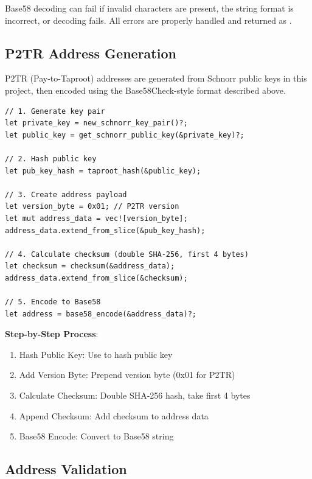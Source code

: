 Base58 decoding can fail if invalid characters are present, the string format is incorrect, or decoding fails. All errors are properly handled and returned as .

\subsection{P2TR Address Generation}
\label{sec:ch08-p2tr-address}

P2TR (Pay-to-Taproot) addresses are generated from Schnorr public keys in this project, then encoded using the Base58Check-style format described above.

\begin{listing}[htbp]
\caption{P2TR address generation flow}
\label{lst:ch08-p2tr-gen}
\begin{verbatim}
// 1. Generate key pair
let private_key = new_schnorr_key_pair()?;
let public_key = get_schnorr_public_key(&private_key)?;

// 2. Hash public key
let pub_key_hash = taproot_hash(&public_key);

// 3. Create address payload
let version_byte = 0x01; // P2TR version
let mut address_data = vec![version_byte];
address_data.extend_from_slice(&pub_key_hash);

// 4. Calculate checksum (double SHA-256, first 4 bytes)
let checksum = checksum(&address_data);
address_data.extend_from_slice(&checksum);

// 5. Encode to Base58
let address = base58_encode(&address_data)?;
\end{verbatim}
\end{listing}

\textbf{Step-by-Step Process}:
\begin{enumerate}
  \item Hash Public Key: Use  to hash public key
  \item Add Version Byte: Prepend version byte (0x01 for P2TR)
  \item Calculate Checksum: Double SHA-256 hash, take first 4 bytes
  \item Append Checksum: Add checksum to address data
  \item Base58 Encode: Convert to Base58 string
\end{enumerate}

\subsection{Address Validation}
\label{sec:ch08-address-validation}

